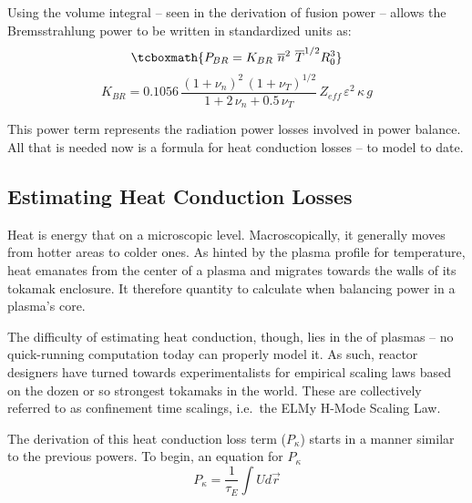 Using the volume integral -- seen in the derivation of fusion power -- allows the Bremsstrahlung power to be written in standardized units as:
\begin{equation}
	\label{eq:pbr}
	\tcboxmath{
	P_{BR} = K_{BR} \ \overline n ^ 2 \ \overline T ^ {1/2} R_0^3
	}
\end{equation}
\begin{equation}
	K_{BR} = 0.1056 \, \frac{ (1+\nu_n)^2 \, (1+\nu_T)^{1/2} }{1+2 \, \nu_n + 0.5 \, \nu_T} \, Z_{eff} \, \varepsilon^2 \, \kappa \, g
\end{equation}

This power term represents the radiation power losses involved in power balance. All that is needed now is a formula for heat conduction losses --  to model to date.

\subsection{Estimating Heat Conduction Losses}

Heat is energy that  on a microscopic level. Macroscopically, it generally moves from hotter areas to colder ones. As hinted by the plasma profile for temperature, heat emanates from the center of a plasma and migrates towards the walls of its tokamak enclosure. It therefore  quantity to calculate when balancing power in a plasma's core.

The difficulty of estimating heat conduction, though, lies in the  of plasmas -- no quick-running computation today can properly model it. As such, reactor designers have turned towards experimentalists for empirical scaling laws based on the dozen or so strongest tokamaks in the world. These are collectively referred to as confinement time scalings, i.e.\ the ELMy H-Mode Scaling Law.

The derivation of this heat conduction loss term ($P_\kappa$) starts in a manner similar to the previous powers. To begin, an equation for $P_\kappa$ 
\begin{equation}
	P_\kappa = \frac{1}{\tau_E} \int U d \vec r
\end{equation}

